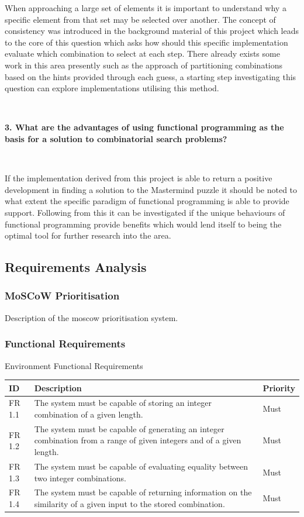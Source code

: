 \documentclass[12pt]{article}  %
\theoremstyle{definition}
\theoremstyle{remark}
\begin{document}
When approaching a large set of elements it is important to understand why a specific element from that set may be selected over another. The concept of consistency was introduced in the background material of this project which leads to the core of this question which asks how should this specific implementation evaluate which combination to select at each step. There already exists some work in this area presently such as the approach of partitioning combinations based on the hints provided through each guess, a starting step investigating this question can explore implementations utilising this method.

\

\textbf{3. What are the advantages of using functional programming as the basis for a solution to combinatorial search problems?}

\

If the implementation derived from this project is able to return a positive development in finding a solution to the Mastermind puzzle it should be noted to what extent the specific paradigm of functional programming is able to provide support. Following from this it can be investigated if the unique behaviours of functional programming provide benefits which would lend itself to being the optimal tool for further research into the area.
\subsection {Requirements Analysis}

\subsubsection {MoSCoW Prioritisation}

Description of the moscow prioritisation system.

\subsubsection {Functional Requirements}

Environment Functional Requirements

\begin{tabularx}{\textwidth}{|X|X|X|}
\hline
ID     & Description                                                                         & Priority \\ \hline
FR 1.1 & The system must be capable of storing an integer combination of a given length.     & Must     \\ \hline
FR 1.2 & The system must be capable of generating an integer combination from a range of given integers and of a given length. & Must \\ \hline
FR 1.3 & The system must be capable of evaluating equality between two integer combinations. & Must     \\ \hline
FR 1.4 & The system must be capable of returning information on the similarity of a given input to the stored combination.     & Must \\ \hline
\end{tabularx}
\end{document}
